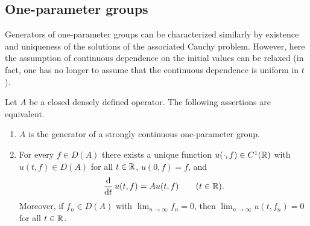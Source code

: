 \subsection{One-parameter groups} \label{subsec:a2-1.se2}%
%
Generators of one-parameter groups can be characterized similarly by existence and uniqueness of the solutions of the associated Cauchy problem.
However, here the assumption of continuous dependence on the initial values can be relaxed (in fact, one has no longer to assume that the continuous dependence is uniform in $t$).
\begin{theorem}\label{thm:a2-1.6}
Let $A$ be a closed densely defined operator.
The following assertions are equivalent.
\begin{enumerate}[\upshape (a)]
\item \label{thm:a2-1.6.1}
$A$ is the generator of a strongly continuous one-parameter group.
\item \label{thm:a2-1.6.2}
For every $f \in D(A)$ there exists a unique function
$u(\cdot,f) \in C^{1}(\mathbb{R})$ with $u(t,f) \in D(A)$ for all $t \in \mathbb{R}$,
$u(0,f) = f$, and
\[
    \frac{\mathop{}\!\mathrm{d}{}}{\mathop{}\!\mathrm{d}{t}}\,u(t,f) = Au(t,f) \qquad (t \in \mathbb{R}).
\]
Moreover, if\/ $f_n \in D(A)$ with $\lim_{n \to \infty} f_n = 0$,
then $\lim_{n \to \infty} u(t,f_n) = 0$ for all $t \in \mathbb{R}$.
\end{enumerate}
\end{theorem}
